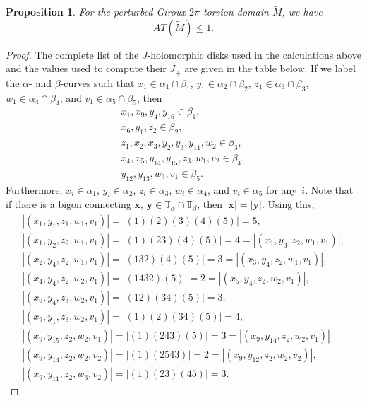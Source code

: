 \documentclass[11pt,oneside,english]{amsart}
\numberwithin{equation}{section}
\numberwithin{figure}{section}
\theoremstyle{definition}
\theoremstyle{plain}
\newtheorem{prop}[thm]{Proposition}
\theoremstyle{plain}
\theoremstyle{remark}
\theoremstyle{plain}
\begin{document}
\begin{prop} \label{prop:gt}
For the perturbed Giroux $2\pi$-torsion domain $\widetilde{M}$, we have
\[
{\mathit{AT}}(\widetilde{M})\le 1.
\]
\end{prop}

\begin{proof}
The complete list of the $J$-holomorphic disks used in the calculations above and
the values used to compute their $J_{+}$ are given in the table below.
If we label the ${\alpha}$- and ${\beta}$-curves such that $x_1 \in {\alpha}_1 \cap {\beta}_1$,
$y_1 \in {\alpha}_2 \cap {\beta}_2$, $z_1 \in {\alpha}_3 \cap {\beta}_3$, $w_1 \in {\alpha}_4 \cap {\beta}_4$,
and $v_1 \in {\alpha}_5 \cap {\beta}_5$, then 
\[
\begin{split}
x_1, x_9, y_4, y_{16} \in {\beta}_1, \\
x_6, y_1, z_2 \in {\beta}_2, \\
z_1, x_2, x_3, y_2, y_3, y_{11}, w_2 \in {\beta}_3, \\
x_4, x_5, y_{14}, y_{15}, z_3, w_1, v_2 \in {\beta}_4, \\
y_{12}, y_{13}, w_3, v_1 \in {\beta}_5. 
\end{split}
\]
Furthermore,
$x_i \in {\alpha}_1$, $y_i \in {\alpha}_2$, $z_i \in {\alpha}_3$, $w_i \in {\alpha}_4$, and $v_i \in {\alpha}_5$
for any~$i$. Note that if there is a bigon connecting ${\mathbf{x}}$, ${\mathbf{y}} \in {\mathbb{T}}_{\alpha} \cap {\mathbb{T}}_{\beta}$,
then $|{\mathbf{x}}| = |{\mathbf{y}}|$.
Using this, 
\[
\begin{split}
|(x_1,y_1,z_1,w_1,v_1)| = |(1)(2)(3)(4)(5)| = 5, \\
|(x_1,y_2,z_2,w_1,v_1)| = |(1)(23)(4)(5)| = 4 = |(x_1,y_3,z_2,w_1,v_1)|, \\
|(x_2,y_4,z_2,w_1,v_1)| = |(132)(4)(5)| = 3 = |(x_3,y_4,z_2,w_1,v_1)|, \\
|(x_4,y_4,z_2,w_2,v_1)| = |(1432)(5)| = 2 = |(x_5,y_4,z_2,w_2,v_1)|, \\
|(x_6,y_4,z_3,w_2,v_1)| = |(12)(34)(5)| =  3, \\
|(x_9,y_1,z_3,w_2,v_1)| = |(1)(2)(34)(5)| = 4, \\
|(x_9,y_{15},z_2,w_2,v_1)| = |(1)(243)(5)| = 3 = |(x_9,y_{14},z_2,w_2,v_1)| \\
|(x_9,y_{14},z_2,w_2,v_2)| = |(1)(2543)| = 2 = |(x_9,y_{12},z_2,w_2,v_2)|, \\
|(x_9,y_{11},z_2,w_3,v_2)| = |(1)(23)(45)| = 3. 
\end{split}
\]


\end{proof}
\end{document}
